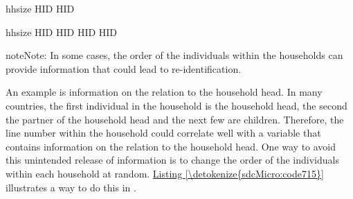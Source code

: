 \documentclass[letterpaper,10pt,english]{sphinxmanual}
\begin{document}
\def\sphinxLiteralBlockLabel{\label{\detokenize{sdcMicro:code714}}}
%
\begin{sphinxVerbatim}[commandchars=\\\{\},numbers=left,firstnumber=1,stepnumber=1]
hhsize  HID HID

hhsize     HID   HID  
                      HID   HID  
\end{sphinxVerbatim}

\begin{sphinxadmonition}{note}{Note:}
In some cases, the order of the individuals within the
households can provide information that could lead to
re-identification.
\end{sphinxadmonition}

An example is information on the relation to the
household head. In many countries, the first individual in the household
is the household head, the second the partner of the household head and
the next few are children. Therefore, the line number within the
household could correlate well with a variable that contains information
on the relation to the household head. One way to avoid this unintended
release of information is to change the order of the individuals within
each household at random. \hyperref[\detokenize{sdcMicro:code715}]{Listing \ref{\detokenize{sdcMicro:code715}}} illustrates a way to do this in
.
\end{document}
